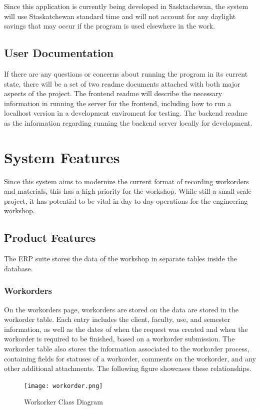{{{{{{{Since this application is currently being  developed in Sasktachewan, the system will use Staskatchewan standard time and will not account for any daylight savings that may occur if the program is used elsewhere in the work.

\subsection{User Documentation}
If there are any questions or concerns about running the program in its current state, there will be a set of two readme documents attached with both major aspects of the project. The frontend readme will describe the necessary information in running the server for the frontend, including how to run a localhost version in a development enviroment for testing. The backend readme as the information regarding running the backend server locally for development.

\newpage 
\section{System Features}
Since this system aims to modernize the current format of recording workorders and materials, this has a high priority for the workshop. While still a small scale project, it has potential to be vital in day to day operations for the engineering workshop. 

\subsection{Product Features}
The ERP suite stores the data of the workshop in separate tables inside the database.

\subsubsection{Workorders}
On the workorders page, workorders are stored on the data are stored in the workorder table. Each entry includes the client, faculty, use, and semester information, as well as the dates of when the request was created and when the workorder is required to be finished, based on a workorder submission. The workorder table also stores the information associated to the workorder process, containing fields for statuses of a workorder, comments on the workorder, and any other additional attachments. The following figure showcases these relationships. 
\begin{figure}[h]
	\centering
	\texttt{[image: workorder.png]}\\
	\caption{Workorker Class Diagram}
	\label{fig:tobias}
\end{figure}

}}}}}}}

